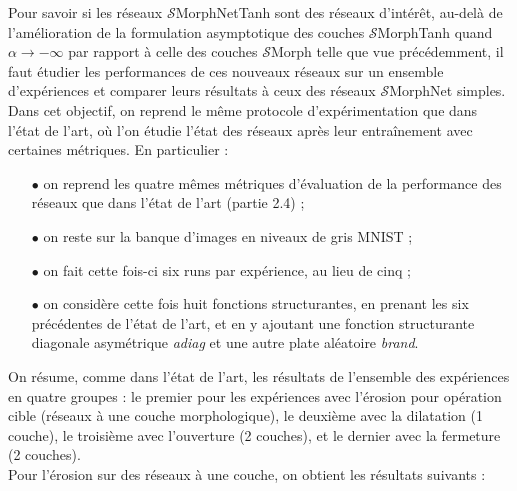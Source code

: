 Pour savoir si les réseaux $\mathcal{S}$MorphNetTanh sont des réseaux d'intérêt, au-delà de l'amélioration de la formulation asymptotique des couches $\mathcal{S}$MorphTanh quand $\alpha \rightarrow -\infty$ par rapport à celle des couches $\mathcal{S}$Morph telle que vue précédemment, il faut étudier les performances de ces nouveaux réseaux sur un ensemble d'expériences et comparer leurs résultats à ceux des réseaux $\mathcal{S}$MorphNet simples. \\

\vspace{-1.6mm}
\noindent Dans cet objectif, on reprend le même protocole d'expérimentation que dans l'état de l'art, où l'on étudie l'état des réseaux après leur entraînement avec certaines métriques. En particulier : 

\vspace{0.4mm}
\begin{itemize}%
    \item[$\bullet$] on reprend les quatre mêmes métriques d'évaluation de la performance des réseaux que dans l'état de l'art (partie 2.4) ;
    \item[$\bullet$] on reste sur la banque d'images en niveaux de gris MNIST ;
    \item[$\bullet$] on fait cette fois-ci six runs par expérience, au lieu de cinq ;
    \item[$\bullet$] on considère cette fois huit fonctions structurantes, en prenant les six précédentes de l'état de l'art, et en y ajoutant une fonction structurante diagonale asymétrique \textit{adiag} et une autre plate aléatoire \textit{brand}.
\end{itemize}

\vspace{2.2mm}
On résume, comme dans l'état de l'art, les résultats de l'ensemble des expériences en quatre groupes : le premier pour les expériences avec l'érosion pour opération cible (réseaux à une couche morphologique), le deuxième avec la dilatation (1 couche), le troisième avec l'ouverture (2 couches), et le dernier avec la fermeture (2 couches). \\

Pour l'érosion sur des réseaux à une couche, on obtient les résultats suivants :

